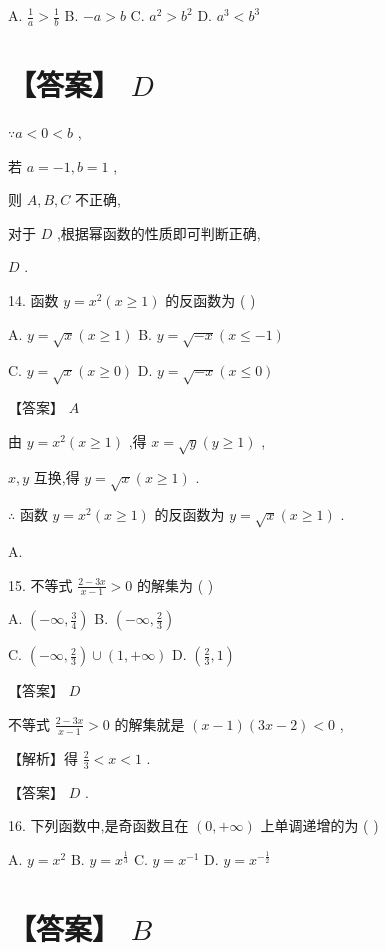 \documentclass[10pt]{article}
\begin{document}
A. \(\frac{1}{a} > \frac{1}{b}\) B. \(- a > b\) C. \({a}^{2} > {b}^{2}\) D. \({a}^{3} < {b}^{3}\)

\section*{【答案】 \(D\)}

\(\because a < 0 < b\) ,

若 \(a =  - 1,b = 1\) ,

则 \(A,B,C\) 不正确,

对于 \(D\) ,根据幂函数的性质即可判断正确,

\(D\) .

14. 函数 \(y = {x}^{2}\left( {x \geq  1}\right)\) 的反函数为 ( )

A. \(y = \sqrt{x}\left( {x \geq  1}\right)\) B. \(y = \sqrt{-x}\left( {x \leq   - 1}\right)\)

C. \(y = \sqrt{x}\left( {x \geq  0}\right)\) D. \(y = \sqrt{-x}\left( {x \leq  0}\right)\)

【答案】 \(A\)

由 \(y = {x}^{2}\left( {x \geq  1}\right)\) ,得 \(x = \sqrt{y}\left( {y \geq  1}\right)\) ,

\(x,y\) 互换,得 \(y = \sqrt{x}\left( {x \geq  1}\right)\) .

\(\therefore\) 函数 \(y = {x}^{2}\left( {x \geq  1}\right)\) 的反函数为 \(y = \sqrt{x}\left( {x \geq  1}\right)\) .

A.

15. 不等式 \(\frac{2 - {3x}}{x - 1} > 0\) 的解集为 ( )

A. \(\left( {-\infty ,\frac{3}{4}}\right)\) B. \(\left( {-\infty ,\frac{2}{3}}\right)\)

C. \(\left( {-\infty ,\frac{2}{3}}\right)  \cup  \left( {1, + \infty }\right)\) D. \(\left( {\frac{2}{3},1}\right)\)

【答案】 \(D\)

不等式 \(\frac{2 - {3x}}{x - 1} > 0\) 的解集就是 \(\left( {x - 1}\right) \left( {{3x} - 2}\right)  < 0\) ,

【解析】得 \(\frac{2}{3} < x < 1\) .

【答案】 \(D\) .

16. 下列函数中,是奇函数且在 \(\left( {0, + \infty }\right)\) 上单调递增的为 ( )

A. \(y = {x}^{2}\) B. \(y = {x}^{\frac{1}{3}}\) C. \(y = {x}^{-1}\) D. \(y = {x}^{-\frac{1}{2}}\)

\section*{【答案】 \(B\)}
\end{document}
